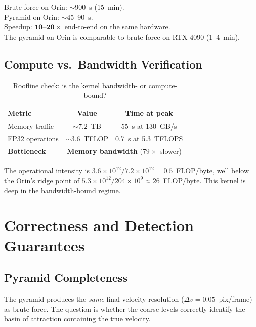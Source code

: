 \documentclass[11pt,letterpaper]{article}
\begin{document}
\begin{keyinsight}
Brute-force on Orin: $\sim$900~s (15~min). \\
Pyramid on Orin: $\sim$45--90~s. \\
Speedup: $\mathbf{10\text{--}20\times}$ end-to-end on the same hardware. \\
The pyramid on Orin is comparable to brute-force on RTX 4090 (1--4~min).
\end{keyinsight}

\subsection{Compute vs.\ Bandwidth Verification}

\begin{table}[h]
\centering
\caption{Roofline check: is the kernel bandwidth- or compute-bound?}
\label{tab:roofline}
\begin{tabular}{lcc}
\toprule
\textbf{Metric} & \textbf{Value} & \textbf{Time at peak} \\
\midrule
Memory traffic    & ${\sim}7.2$~TB & 55~s at 130~GB/s \\
FP32 operations   & ${\sim}3.6$~TFLOP & 0.7~s at 5.3~TFLOPS \\
\midrule
\textbf{Bottleneck} & \multicolumn{2}{c}{\textbf{Memory bandwidth} ($79\times$ slower)} \\
\bottomrule
\end{tabular}
\end{table}

The operational intensity is $3.6 \times 10^{12} / 7.2 \times 10^{12} = 0.5$~FLOP/byte,
well below the Orin's ridge point of $5.3 \times 10^{12} / 204 \times 10^9 \approx 26$~FLOP/byte.
This kernel is deep in the bandwidth-bound regime.


\section{Correctness and Detection Guarantees}
\label{sec:correctness}

\subsection{Pyramid Completeness}

The pyramid produces the \emph{same} final velocity resolution
($\Delta v = 0.05$~pix/frame) as brute-force. The question is whether
the coarse levels correctly identify the basin of attraction containing
the true velocity.
\end{document}
